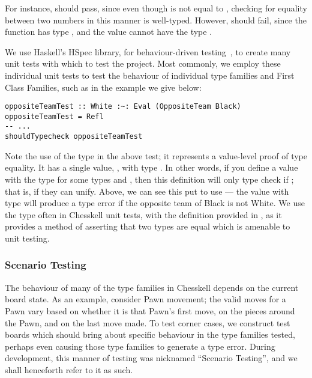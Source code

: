 For instance,  should pass, since even though  is not equal to , checking for equality between two numbers in this manner is well-typed. However,  should fail, since the function  has type , and the value  cannot have the type .

We use Haskell's HSpec library, for behaviour-driven testing~\cite{hspec}, to create many unit tests with which to test the project. Most commonly, we employ these individual unit tests to test the behaviour of individual type families and First Class Families, such as in the example we give below:

\begin{lstlisting}
oppositeTeamTest :: White :~: Eval (OppositeTeam Black)
oppositeTeamTest = Refl
-- ...
shouldTypecheck oppositeTeamTest
\end{lstlisting}

Note the use of the \inline{(:~:)} type in the above test; it represents a value-level proof of type equality. It has a single value, , with type . In other words, if you define a  value with the type  for some types  and , then this definition will only type check if ; that is, if they can unify. Above, we can see this put to use --- the  value with type  will produce a type error if the opposite team of Black is not White. We use the \inline{(:~:)} type often in Chesskell unit tests, with the definition provided in , as it provides a method of asserting that two types are equal which is amenable to unit testing.

\subsubsection{Scenario Testing} \label{scenariosection}

The behaviour of many of the type families in Chesskell depends on the current board state. As an example, consider Pawn movement; the valid moves for a Pawn vary based on whether it is that Pawn's first move, on the pieces around the Pawn, and on the last move made. To test corner cases, we construct test boards which should bring about specific behaviour in the type families tested, perhaps even causing those type families to generate a type error. During development, this manner of testing was nicknamed ``Scenario Testing'', and we shall henceforth refer to it as such.

